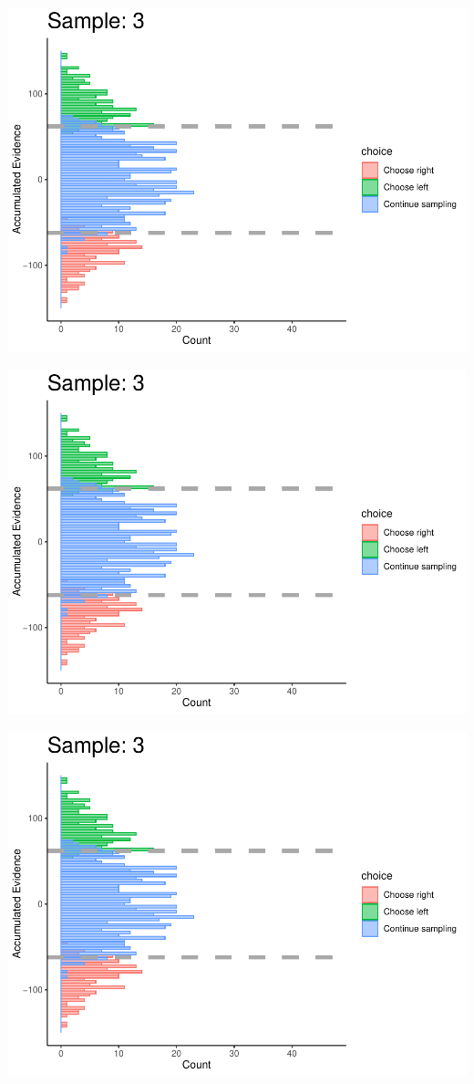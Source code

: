 \documentclass[
]{book}
\begin{document}
\begin{center}\includegraphics[width=0.8\linewidth]{LateNightBayes_files/figure-latex/collapsing_check-23} \end{center}

\begin{center}\includegraphics[width=0.8\linewidth]{LateNightBayes_files/figure-latex/collapsing_check-24} \end{center}

\begin{center}\includegraphics[width=0.8\linewidth]{LateNightBayes_files/figure-latex/collapsing_check-25} \end{center}
\end{document}
